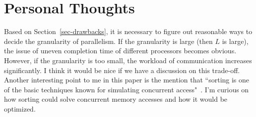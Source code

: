 \documentclass[10pt, letterpaper]{article}
\begin{document}
\section{Personal Thoughts}
\label{sec-thoughts}
Based on Section~\ref{sec-drawbacks}, it is necessary to figure out reasonable ways to decide the granularity of parallelism. If the granularity is large (then $L$ is large), the issue of uneven completion time of different processors becomes obvious. However, if the granularity is too small, the workload of communication increases significantly. I think it would be nice if we have a discussion on this trade-off.
\\Another interesting point to me in this paper is the mention that ``sorting is one of the basic techniques known for simulating concurrent access"~\cite{valiant-cacm-1990}. I'm curious on how sorting could solve concurrent memory accesses and how it would be optimized.  




\end{document}
